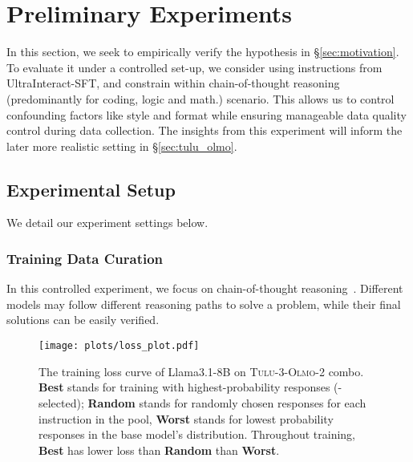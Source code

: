 \section{Preliminary Experiments}
\label{sec:experiments_ultra}
In this section, we seek to empirically verify the hypothesis in \S\ref{sec:motivation}. To evaluate it under a controlled set-up, we consider using instructions from UltraInteract-SFT, and constrain within chain-of-thought reasoning (predominantly for coding, logic and math.) scenario. This allows us to control confounding factors like style and format while ensuring manageable data quality control during data collection. The insights from this experiment will inform the later more realistic setting in \S\ref{sec:tulu_olmo}.

% 



\subsection{Experimental Setup}
We detail our experiment settings below. 

\subsubsection{Training Data Curation} 
In this controlled experiment, we focus on chain-of-thought  reasoning~\cite{wei2022chainofthought,wang2024mathshepherd,luo2024improvemathematicalreasoninglanguage,cobbe2021trainingverifierssolvemath,li2023making,lightman2023letsverifystepstep}. Different models may follow different reasoning paths to solve a problem, while their final solutions can be easily verified.

\begin{figure}
    \centering
\texttt{[image: plots/loss\_plot.pdf]}
    \caption{The training loss curve of Llama3.1-8B on \textsc{Tulu-3}-\textsc{Olmo-2} combo. \textbf{Best} stands for training with highest-probability responses (\name-selected);   \textbf{Random} stands for randomly chosen responses for each instruction in the pool, \textbf{Worst} stands for lowest probability responses in the base model's distribution. Throughout training, \textbf{Best} has lower loss than \textbf{Random} than \textbf{Worst}.}
    \label{fig:overview}
\end{figure}


